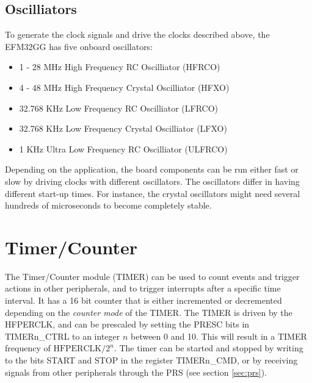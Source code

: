 \subsection{Oscilliators}
To generate the clock signals and drive the clocks described above, the EFM32GG has five onboard oscillators:
\begin{itemize}
  \item 1 - 28 MHz High Frequency RC Oscilliator (HFRCO)
  \item 4 - 48 MHz High Frequency Crystal Oscilliator (HFXO)
  \item 32.768 KHz Low Frequency RC Oscilliator (LFRCO)
  \item 32.768 KHz Low Frequency Crystal Oscilliator (LFXO)
  \item 1 KHz Ultra Low Frequency RC Oscilliator (ULFRCO)
\end{itemize}
Depending on the application, the board components can be run either fast or slow by driving clocks with different oscillators. The oscillators differ in having different start-up times. For instance, the crystal oscillators might need several hundreds of microseconds to become completely stable.\cite{efm32-clock-management-unit-application-note}


\section{Timer/Counter}\label{sec:timer}
The Timer/Counter module (TIMER) can be used to count events and trigger actions in other peripherals, and to trigger interrupts after a specific time interval. It has a 16 bit counter that is either incremented or decremented depending on the \emph{counter mode} of the TIMER. The TIMER is driven by the HFPERCLK, and can be prescaled by setting the PRESC bits in TIMERn\_CTRL to an integer $n$ between 0 and 10. This will result in a TIMER frequency of $\text{HFPERCLK}/2^{n}$. The timer can be started and stopped by writing to the bits START and STOP in the register TIMERn\_CMD, or by receiving signals from other peripherals through the PRS (see section \ref{sec:prs}).

%



